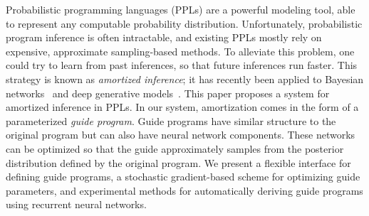 
Probabilistic programming languages (PPLs) are a powerful modeling tool, able to represent any computable probability distribution.
%
Unfortunately, probabilistic program inference is often intractable, and existing PPLs mostly rely on expensive, approximate sampling-based methods.
%
To alleviate this problem, one could try to learn from past inferences, so that future inferences run faster.
This strategy is known as \emph{amortized inference}; it has recently been applied to Bayesian networks~\cite{StochasticInverses,NeuralStochasticInverses} and deep generative models~\cite{NVIL,AEVB,DLGM}.
%
This paper proposes a system for amortized inference in PPLs.
In our system, amortization comes in the form of a parameterized \emph{guide program}.
Guide programs have similar structure to the original program but can also have neural network components.
These networks can be optimized so that the guide approximately samples from the posterior distribution defined by the original program.
We present a flexible interface for defining guide programs, a stochastic gradient-based scheme for optimizing guide parameters, and experimental methods for automatically deriving guide programs using recurrent neural networks.
%

